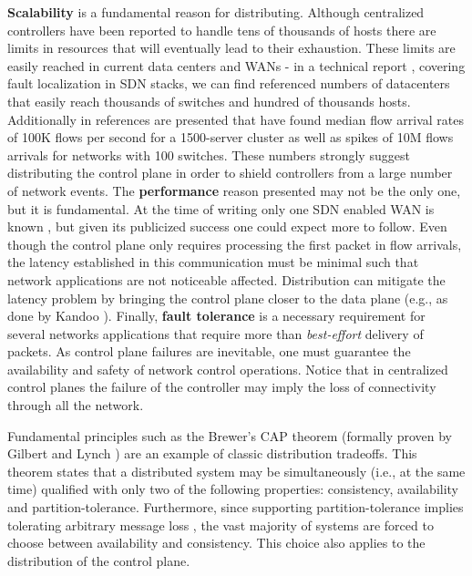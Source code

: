 \textbf{Scalability} is a fundamental reason for distributing. Although centralized controllers have been reported  to handle  tens of thousands of hosts \cite{Casado:2007kb}  there are limits in resources that will eventually lead to their exhaustion. These limits are easily reached in current data centers and WANs - in a technical report \cite{Scott:2012tt}, covering fault localization in SDN stacks, we can find referenced numbers of datacenters  that easily reach thousands of switches and hundred of thousands hosts. Additionally in \cite{Tootoonchian:2012uia} references are presented that have found median flow arrival rates of 100K flows per second for a 1500-server cluster as well as spikes of 10M flows arrivals for networks with 100 switches. These numbers strongly  suggest distributing the control plane in order to shield controllers from a large number of network events. 
The \textbf{performance} reason presented may not be the only one, but it is fundamental. At the time of writing only one SDN enabled WAN is known \cite{Hoezle:2012uq}, but given its publicized success one could expect more to follow. Even though the control plane only requires processing  the first packet in flow arrivals, the latency established in this communication must be minimal such that network applications are not noticeable affected. Distribution can mitigate the latency problem by bringing the control plane closer to the data plane (e.g., as done by Kandoo \cite{Yeganeh:2012jm}). 
Finally, \textbf{fault tolerance} is a necessary requirement for several networks applications that require more than \emph{best-effort} delivery of packets. As control plane failures are inevitable, one must guarantee the availability and safety of network control operations. Notice that in centralized control planes the failure of the controller may imply the loss of connectivity through all the network. 

Fundamental principles such as the  Brewer's CAP theorem \cite{Brewer:fk} (formally proven by Gilbert and Lynch \cite{Gilbert:2002il}) are an example of classic distribution tradeoffs. This theorem states that a distributed system may be simultaneously (i.e., at the same time) qualified with only two of the following properties: consistency, availability and partition-tolerance. Furthermore, since supporting partition-tolerance implies tolerating arbitrary message loss  \cite{Gilbert:2002il},  the vast majority of systems are forced to choose between availability and consistency. This choice also applies to the distribution of the control plane. 

